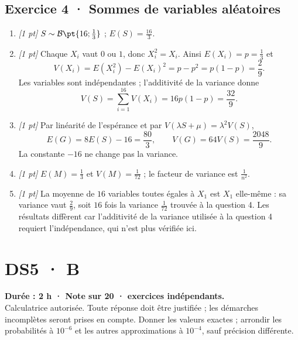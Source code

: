 \subsection*{Exercice 4 · Sommes de variables aléatoires}\begin{enumerate}

\item \textit{[1 pt]} $S\sim\mathcal B\pt{16;\frac{1}{3}}$ ; $E(S)=\frac{16}{3}$.

\item \textit{[1 pt]} Chaque $X_i$ vaut $0$ ou $1$, donc $X_i^2=X_i$. Ainsi $E(X_i)=p=\frac{1}{3}$ et
\[V(X_i)=E(X_i^2)-E(X_i)^2=p-p^2=p(1-p)=\frac{2}{9}.\]
Les variables sont indépendantes ; l'additivité de la variance donne
\[V(S)=\sum_{i=1}^{16}V(X_i)=16p(1-p)=\frac{32}{9}.\]

\item \textit{[1 pt]} Par linéarité de l'espérance et par $V(\lambda S+\mu)=\lambda^2V(S)$,
\[E(G)=8E(S)-16=\frac{80}{3},\qquad V(G)=64V(S)=\frac{2048}{9}.\]
La constante $-16$ ne change pas la variance.

\item \textit{[1 pt]} $E(M)=\frac{1}{3}$ et $V(M)=\frac{1}{72}$ ; le facteur de variance est $\frac{1}{n^2}$.

\item \textit{[1 pt]} La moyenne de $16$ variables toutes égales à $X_1$ est $X_1$ elle-même : sa variance vaut $\frac{2}{9}$, soit $16$ fois la variance $\frac{1}{72}$ trouvée à la question 4. Les résultats diffèrent car l'additivité de la variance utilisée à la question 4 requiert l'indépendance, qui n'est plus vérifiée ici.

\end{enumerate}

\fi

\fi

\ifmxteacher

\mxnewpage{}\label{sujet:7-4}

\section*{DS5 · B}


\textbf{Durée : 2 h · Note sur 20 ·  exercices indépendants.}\\Calculatrice autorisée. Toute réponse doit être justifiée ; les démarches incomplètes seront prises en compte. Donner les valeurs exactes ; arrondir les probabilités à $10^{-6}$ et les autres approximations à $10^{-4}$, sauf précision différente.


